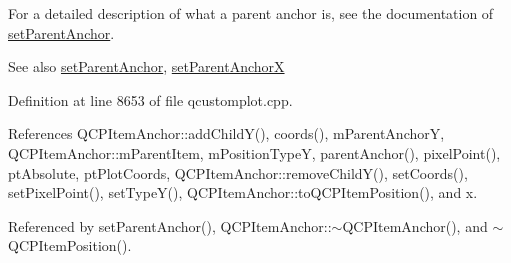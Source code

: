 For a detailed description of what a parent anchor is, see the documentation of \hyperlink{class_q_c_p_item_position_ac094d67a95d2dceafa0d50b9db3a7e51}{set\+Parent\+Anchor}.

\begin{DoxySeeAlso}{See also}
\hyperlink{class_q_c_p_item_position_ac094d67a95d2dceafa0d50b9db3a7e51}{set\+Parent\+Anchor}, \hyperlink{class_q_c_p_item_position_add71461a973927c74e42179480916d9c}{set\+Parent\+Anchor\+X} 
\end{DoxySeeAlso}


Definition at line 8653 of file qcustomplot.\+cpp.



References Q\+C\+P\+Item\+Anchor\+::add\+Child\+Y(), coords(), m\+Parent\+Anchor\+Y, Q\+C\+P\+Item\+Anchor\+::m\+Parent\+Item, m\+Position\+Type\+Y, parent\+Anchor(), pixel\+Point(), pt\+Absolute, pt\+Plot\+Coords, Q\+C\+P\+Item\+Anchor\+::remove\+Child\+Y(), set\+Coords(), set\+Pixel\+Point(), set\+Type\+Y(), Q\+C\+P\+Item\+Anchor\+::to\+Q\+C\+P\+Item\+Position(), and x.



Referenced by set\+Parent\+Anchor(), Q\+C\+P\+Item\+Anchor\+::$\sim$\+Q\+C\+P\+Item\+Anchor(), and $\sim$\+Q\+C\+P\+Item\+Position().


